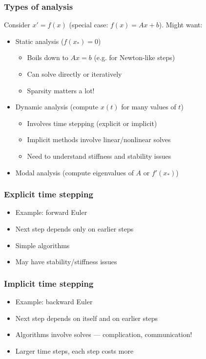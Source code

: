 \documentclass{beamer}
\begin{document}
\begin{frame}
  \frametitle{Types of analysis}
  
  Consider $x' = f(x)$ (special case: $f(x) = Ax + b$).  Might want:
  \begin{itemize}
  \item Static analysis ($f(x_*) = 0$)
    \begin{itemize}
    \item Boils down to $Ax = b$ (e.g. for Newton-like steps)
    \item Can solve directly or iteratively
    \item Sparsity matters a lot!
    \end{itemize}
  \item Dynamic analysis (compute $x(t)$ for many values of $t$)
    \begin{itemize}
    \item Involves time stepping (explicit or implicit)
    \item Implicit methods involve linear/nonlinear solves
    \item Need to understand stiffness and stability issues
    \end{itemize}
  \item Modal analysis (compute eigenvalues of $A$ or $f'(x_*)$)
  \end{itemize}

\end{frame}


\begin{frame}
  \frametitle{Explicit time stepping}
  
  \begin{itemize}
  \item Example: forward Euler
  \item Next step depends only on earlier steps
  \item Simple algorithms
  \item May have stability/stiffness issues
  \end{itemize}

\end{frame}


\begin{frame}
  \frametitle{Implicit time stepping}
  
  \begin{itemize}
  \item Example: backward Euler
  \item Next step depends on itself and on earlier steps
  \item Algorithms involve solves --- complication, communication!
  \item Larger time steps, each step costs more
  \end{itemize}

\end{frame}
\end{document}
